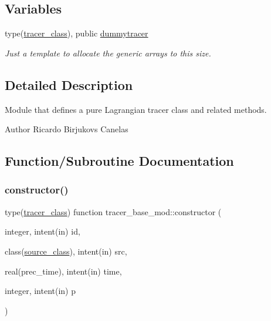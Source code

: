 \subsection*{Variables}
\begin{DoxyCompactItemize}
\item 
type(\mbox{\hyperlink{structtracer__base__mod_1_1tracer__class}{tracer\+\_\+class}}), public \mbox{\hyperlink{namespacetracer__base__mod_a6e04d44b4ef46cf27fb0e38290a98c14}{dummytracer}}
\begin{DoxyCompactList}\small\item\em Just a template to allocate the generic arrays to this size. \end{DoxyCompactList}\end{DoxyCompactItemize}


\subsection{Detailed Description}
Module that defines a pure Lagrangian tracer class and related methods. 

\begin{DoxyAuthor}{Author}
Ricardo Birjukovs Canelas 
\end{DoxyAuthor}


\subsection{Function/\+Subroutine Documentation}
\mbox{\label{namespacetracer__base__mod_ab1e40296d34ae434e792768d1b77859f}} 
\subsubsection{\texorpdfstring{constructor()}{constructor()}}
{\footnotesize\ttfamily type(\mbox{\hyperlink{structtracer__base__mod_1_1tracer__class}{tracer\+\_\+class}}) function tracer\+\_\+base\+\_\+mod\+::constructor (\begin{DoxyParamCaption}\item[{integer, intent(in)}]{id,  }\item[{class(\mbox{\hyperlink{structsources__mod_1_1source__class}{source\+\_\+class}}), intent(in)}]{src,  }\item[{real(prec\+\_\+time), intent(in)}]{time,  }\item[{integer, intent(in)}]{p }\end{DoxyParamCaption})\hspace{0.3cm}{\ttfamily [private]}}




